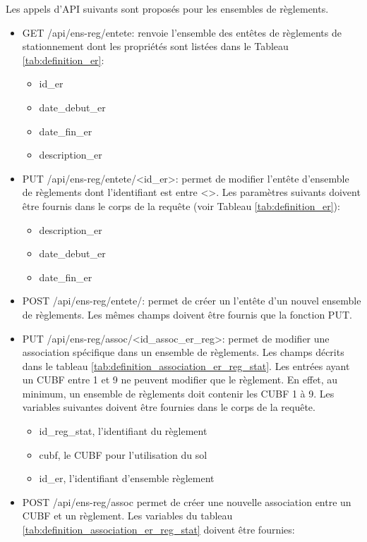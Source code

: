 Les appels d'\ac{API} suivants sont proposés pour les ensembles de règlements.
\begin{itemize}
    \item GET /api/ens-reg/entete: renvoie l'ensemble des entêtes de règlements de stationnement dont les propriétés sont listées dans le Tableau \ref{tab:definition_er}:
    \begin{itemize}
        \item id\_er 
        \item date\_debut\_er
        \item date\_fin\_er
        \item description\_er
    \end{itemize}
    \item PUT /api/ens-reg/entete/<id\_er>: permet de modifier l'entête d'ensemble de règlements dont l'identifiant est entre <>. Les paramètres suivants doivent être fournis dans le corps de la requête (voir Tableau \ref{tab:definition_er}):
    \begin{itemize}
        \item description\_er
        \item date\_debut\_er
        \item date\_fin\_er
    \end{itemize}
    \item POST /api/ens-reg/entete/: permet de créer un l'entête d'un nouvel ensemble de règlements. Les mêmes champs doivent être fournis que la fonction PUT.
    \item PUT /api/ens-reg/assoc/<id\_assoc\_er\_reg>: permet de modifier une association spécifique dans un ensemble de règlements. Les champs décrits dans le tableau \ref{tab:definition_association_er_reg_stat}. Les entrées ayant un \ac{CUBF} entre 1 et 9 ne peuvent modifier que le règlement. En effet, au minimum, un ensemble de règlements doit contenir les CUBF 1 à 9. Les variables suivantes doivent être fournies dans le corps de la requête.
    \begin{itemize}
        \item id\_reg\_stat, l'identifiant du règlement
        \item cubf, le \ac{CUBF} pour l'utilisation du sol
        \item id\_er, l'identifiant d'ensemble règlement
    \end{itemize}
    \item POST /api/ens-reg/assoc permet de créer une nouvelle association entre un \ac{CUBF} et un règlement. Les variables du tableau \ref{tab:definition_association_er_reg_stat} doivent être fournies:

\end{itemize}
